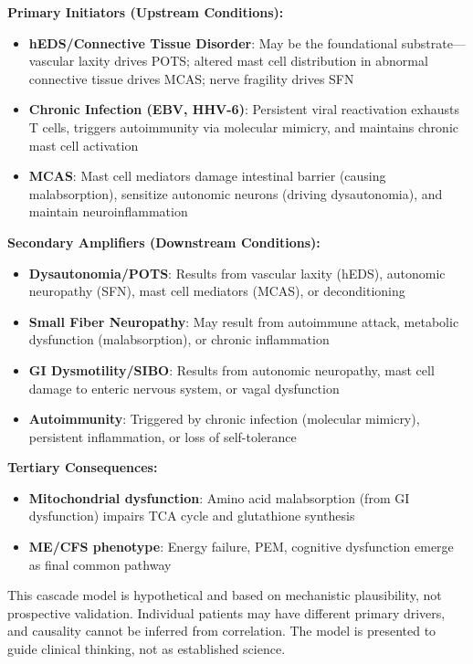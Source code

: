 \textbf{Primary Initiators (Upstream Conditions):}
\begin{itemize}
    \item \textbf{hEDS/Connective Tissue Disorder}: May be the foundational substrate---vascular laxity drives POTS; altered mast cell distribution in abnormal connective tissue drives MCAS; nerve fragility drives SFN
    \item \textbf{Chronic Infection (EBV, HHV-6)}: Persistent viral reactivation exhausts T cells, triggers autoimmunity via molecular mimicry, and maintains chronic mast cell activation
    \item \textbf{MCAS}: Mast cell mediators damage intestinal barrier (causing malabsorption), sensitize autonomic neurons (driving dysautonomia), and maintain neuroinflammation
\end{itemize}

\textbf{Secondary Amplifiers (Downstream Conditions):}
\begin{itemize}
    \item \textbf{Dysautonomia/POTS}: Results from vascular laxity (hEDS), autonomic neuropathy (SFN), mast cell mediators (MCAS), or deconditioning
    \item \textbf{Small Fiber Neuropathy}: May result from autoimmune attack, metabolic dysfunction (malabsorption), or chronic inflammation
    \item \textbf{GI Dysmotility/SIBO}: Results from autonomic neuropathy, mast cell damage to enteric nervous system, or vagal dysfunction
    \item \textbf{Autoimmunity}: Triggered by chronic infection (molecular mimicry), persistent inflammation, or loss of self-tolerance
\end{itemize}

\textbf{Tertiary Consequences:}
\begin{itemize}
    \item \textbf{Mitochondrial dysfunction}: Amino acid malabsorption (from GI dysfunction) impairs TCA cycle and glutathione synthesis
    \item \textbf{ME/CFS phenotype}: Energy failure, PEM, cognitive dysfunction emerge as final common pathway
\end{itemize}

\begin{limitation}
This cascade model is hypothetical and based on mechanistic plausibility, not prospective validation. Individual patients may have different primary drivers, and causality cannot be inferred from correlation. The model is presented to guide clinical thinking, not as established science.
\end{limitation}

